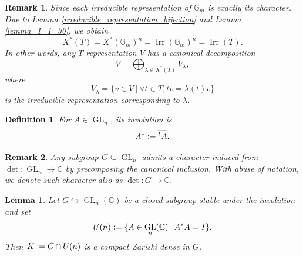 \documentclass[10pt]{article}
\newtheorem{definition}{Definition}[section]
\newtheorem{lemma}{Lemma}[section]
\newtheorem{remark}{Remark}[section]
\numberwithin{equation}{theorem}
\DeclareMathOperator{\Irr}{Irr}
\DeclareMathOperator{\GL}{GL}
\newcommand{\defeq}{\vcentcolon=}
\newcommand{\C}[0]{\mathbb{C}}
\newcommand{\G}[0]{\mathbb{G}}
\newcommand{\sep}[0]{\:|\:}
\begin{document}
\begin{remark}
  Since each irreducible representation of $\G_m$ is exactly its character. Due to Lemma \ref{irreducible_representation_bijection} and Lemma \ref{lemma_1_1_30}, we obtain
  \begin{equation*}
    X^*(T) = X^*(\G_m)^n = \Irr(\G_m)^{n} = \Irr(T).
  \end{equation*}
  In other words, any $T$-representation $V$ has a canonical decomposition 
  \begin{equation*}
  V = \bigoplus_{\lambda\in X^*(T)}V_\lambda,
  \end{equation*}
  where 
  \begin{equation*}
    V_\lambda = \{v\in V\sep \forall t\in T, tv = \lambda(t)v\}
  \end{equation*}
  is the irreducible representation corresponding to $\lambda$.
\end{remark}
\begin{definition}
  For $A\in\GL_n$, its involution is 
  \begin{equation*}
    A^* \defeq \overline{\prescript{t}{}{A}}.
  \end{equation*}
\end{definition}
\begin{remark}
  Any subgroup $G\subseteq\GL_n$ admits a character induced from $\det:\GL_n\to \C$ by precomposing the canonical inclusion.
  With abuse of notation, we denote such character also as $\det:G\to \C$.
\end{remark}
\begin{lemma}
  \label{lemma_theorem_1_1_30}
  Let $G\hookrightarrow\GL_n(\C)$ be a closed subgroup stable under the involution and set 
  \begin{equation*}
    U(n)\defeq \{A\in\GL_n(\C)\sep A^*A = I\}.
  \end{equation*}
  Then $K\defeq G\cap U(n)$ is a compact Zariski dense in $G$.
\end{lemma}
\end{document}
